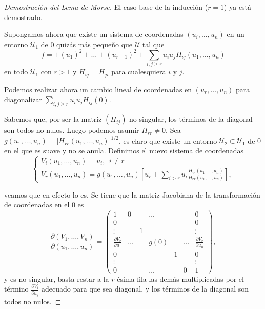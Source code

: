\begin{proof}[Demostración del Lema de Morse]
    El caso base de la inducción ($r=1$) ya está demostrado.

    Supongamos ahora que existe un sistema de coordenadas $(u_i,\dots,u_n)$ en un entorno $\mathcal{U}_1$ de $0$ quizás más pequeño que $\mathcal{U}$ tal que
    \begin{equation}
        f = \pm (u_1)^2 \pm\dots\pm (u_{r-1})^2 + \sum_{i,j\ge r} u_i u_j H_{ij}(u_1,\dots,u_n)
    \label{eq1}
    \end{equation}
    en todo $\mathcal{U}_1$ con $r > 1$ y $H_{ij}=H_{ji}$ para cualesquiera $i$ y $j$.

    Podemos realizar ahora un cambio lineal de coordenadas en $(u_r,\dots, u_n)$ para diagonalizar $\sum_{i,j\ge r} u_i u_j H_{ij}(0)$.
    
    Sabemos que, por ser la matriz $(H_{ij})$ no singular, los términos de la diagonal son todos no nulos. Luego podemos asumir $H_{rr}\neq 0$. Sea $g(u_1,\dots,u_n)=|H_{rr}(u_1,\dots,u_n)|^{1/2}$, es claro que existe un entorno $\mathcal{U}_2\subset \mathcal{U}_1$ de $0$ en el que es suave y no se anula. Definimos el nuevo sistema de coordenadas
    \begin{equation}
        \begin{cases}
            V_i(u_1,\dots,u_n) = u_i,~~i\neq r\\
            V_r(u_1,\dots,u_n)=g(u_1,\dots,u_n)\left[u_r+\sum_{i>r}u_i\frac{H_{ir}(u_1,\dots,u_n)}{H_{rr}(u_1,\dots,u_n)}\right],
        \end{cases}
    \label{eq2}
    \end{equation}

    veamos que en efecto lo es. Se tiene que la matriz Jacobiana de la transformación de coordenadas en el $0$ es
    \begin{equation*}
        \frac{\partial (V_1,\dots, V_n)}{\partial (u_1,\dots, u_n)} = 
        \begin{pmatrix}
            1 & 0 & ~ & \dots & ~ & ~ & 0 \\
            0 & ~ & ~ & ~ & ~ & ~ & 0 \\
            \vdots & ~ & 1 & ~ & ~ & ~ & \vdots \\
            \frac{\partial V_r}{\partial u_1} & \dots & ~ & g(0) & ~ & \dots & \frac{\partial V_r}{\partial u_n} \\
            0 & ~ & ~ & ~ & 1 & ~ & 0 \\
            \vdots & ~ & ~ & ~ & ~ & ~ & \vdots \\
            0 & ~ & ~ & \dots & ~ & 0 & 1
        \end{pmatrix},
    \end{equation*}
    y es no singular, basta restar a la $r$-ésima fila las demás multiplicadas por el término $\frac{\partial V_i}{\partial u_j}$ adecuado para que sea diagonal, y los términos de la diagonal son todos no nulos.


\end{proof}
